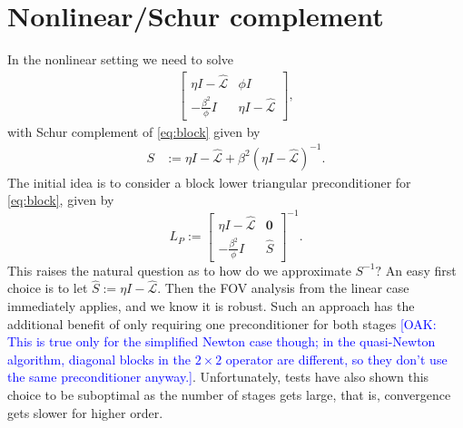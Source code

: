 \documentclass[a4paper,10pt]{article}
\newcommand{\tcb}{\textcolor{blue}}
\begin{document}
\section{Nonlinear/Schur complement}

In the nonlinear setting we need to solve
%
\begin{align}\label{eq:block}
\begin{bmatrix} \eta I - \widehat{\mathcal{L}} & \phi I\\
	-\frac{\beta^2}{\phi} I & \eta I - \widehat{\mathcal{L}}\end{bmatrix},
\end{align}
%
with Schur complement of \eqref{eq:block} given by
%
\begin{align}\label{eq:simpSchur}
S & := \eta I - \widehat{\mathcal{L}} + \beta^2 (\eta I - \widehat{\mathcal{L}})^{-1}.
\end{align}
%
The initial idea is to consider a block lower triangular preconditioner for \eqref{eq:block},
given by
%
\begin{equation}\label{eq:Lprec}
L_P := \begin{bmatrix} \eta I - \widehat{\mathcal{L}} & \mathbf{0} \\ -\frac{\beta^2}{\phi} I
	& \widehat{S}\end{bmatrix}^{-1}.
\end{equation}
%
This raises the natural question as to how do we approximate $S^{-1}?$ An easy first
choice is to let $\widehat{S} := \eta I - \widehat{\mathcal{L}}$. Then the FOV analysis
from the linear case immediately applies, and we know it is robust. Such an approach has
the additional benefit of only requiring one preconditioner for both stages \tcb{[OAK: This is true only for the simplified Newton case though; in the quasi-Newton algorithm, diagonal blocks in the $2 \times 2$ operator are different, so they don't use the same preconditioner anyway.]}. Unfortunately,
tests have also shown this choice to be suboptimal as the number of stages gets large,
that is, convergence gets slower for higher order.

\end{document}
